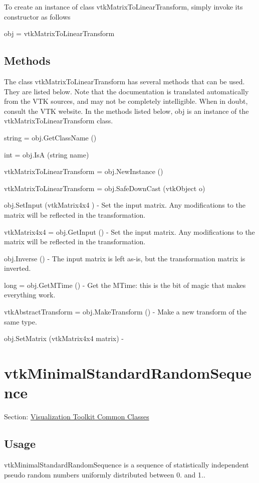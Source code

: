 To create an instance of class vtk\-Matrix\-To\-Linear\-Transform, simply invoke its constructor as follows \begin{DoxyVerb}  obj = vtkMatrixToLinearTransform
\end{DoxyVerb}
 \hypertarget{vtkwidgets_vtkxyplotwidget_Methods}{}\subsection{Methods}\label{vtkwidgets_vtkxyplotwidget_Methods}
The class vtk\-Matrix\-To\-Linear\-Transform has several methods that can be used. They are listed below. Note that the documentation is translated automatically from the V\-T\-K sources, and may not be completely intelligible. When in doubt, consult the V\-T\-K website. In the methods listed below, {\ttfamily obj} is an instance of the vtk\-Matrix\-To\-Linear\-Transform class. 
\begin{DoxyItemize}
\item {\ttfamily string = obj.\-Get\-Class\-Name ()}  
\item {\ttfamily int = obj.\-Is\-A (string name)}  
\item {\ttfamily vtk\-Matrix\-To\-Linear\-Transform = obj.\-New\-Instance ()}  
\item {\ttfamily vtk\-Matrix\-To\-Linear\-Transform = obj.\-Safe\-Down\-Cast (vtk\-Object o)}  
\item {\ttfamily obj.\-Set\-Input (vtk\-Matrix4x4 )} -\/ Set the input matrix. Any modifications to the matrix will be reflected in the transformation.  
\item {\ttfamily vtk\-Matrix4x4 = obj.\-Get\-Input ()} -\/ Set the input matrix. Any modifications to the matrix will be reflected in the transformation.  
\item {\ttfamily obj.\-Inverse ()} -\/ The input matrix is left as-\/is, but the transformation matrix is inverted.  
\item {\ttfamily long = obj.\-Get\-M\-Time ()} -\/ Get the M\-Time\-: this is the bit of magic that makes everything work.  
\item {\ttfamily vtk\-Abstract\-Transform = obj.\-Make\-Transform ()} -\/ Make a new transform of the same type.  
\item {\ttfamily obj.\-Set\-Matrix (vtk\-Matrix4x4 matrix)} -\/  
\end{DoxyItemize}\hypertarget{vtkcommon_vtkminimalstandardrandomsequence}{}\section{vtk\-Minimal\-Standard\-Random\-Sequence}\label{vtkcommon_vtkminimalstandardrandomsequence}
Section\-: \hyperlink{sec_vtkcommon}{Visualization Toolkit Common Classes} \hypertarget{vtkwidgets_vtkxyplotwidget_Usage}{}\subsection{Usage}\label{vtkwidgets_vtkxyplotwidget_Usage}
vtk\-Minimal\-Standard\-Random\-Sequence is a sequence of statistically independent pseudo random numbers uniformly distributed between 0. and 1..

